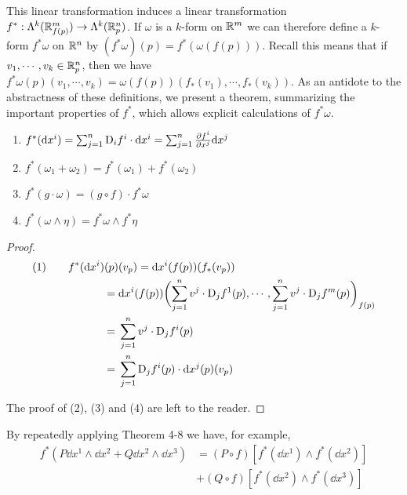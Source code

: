 This linear transformation induces a linear transformation $f^*:\Lambda^k(\mathbb{R}^m_{f(p)})\to \Lambda^k(\mathbb{R}^n_p)$.
If $\omega$ is a $k$-form on $\mathbb{R}^m$ we can therefore define a $k$-form $f^*\omega$ on $\mathbb{R}^n$ by
$(f^*\omega)(p) = f^*(\omega(f(p)))$. Recall this means that if $v_1,\cdots,v_k\in\mathbb{R}^n_p$, then we have 
$f^*\omega(p)(v_1,\cdots,v_k) = \omega(f(p))(f_*(v_1), \cdots, f_*(v_k))$. As an antidote to the abstractness
of these definitions, we present a theorem, summarizing the important properties of $f^*$, which allows explicit 
calculations of $f^*\omega$.

\begin{theorem}
    \begin{enumerate}[label=\upshape{(\arabic*)}]
        \item $f^*(\mathrm{d} x^i) = \sum_{j=1}^{n}{\mathrm{D}_if^i\cdot \mathrm{d} x^i} = \sum_{j=1}^{n}{\frac{\partial f^i}{\partial x^j}\mathrm{d} x^j}$
        \item $f^*(\omega_1+\omega_2) = f^*(\omega_1) + f^*(\omega_2)$
        \item $f^*(g\cdot \omega) = (g\circ f)\cdot f^*\omega$
        \item $f^*(\omega\wedge\eta) = f^*\omega\wedge f^*\eta$
    \end{enumerate}
\end{theorem}

\begin{proof}
  \begin{align*}
      \text{(1)}\qquad f^*(\mathrm{d} x^i)(p)&(v_p)
        = \mathrm{d} x^i(f(p))(f_*(v_p)) \\
      =\; & \mathrm{d} x^i(f(p))\biggl(\sum_{j=1}^{n}{v^j\cdot \mathrm{D}_jf^1(p)}, \cdots, \sum_{j=1}^{n}{v^j\cdot \mathrm{D}_jf^m(p)}\biggr)_{f(p)} \\
      =\; & \sum_{j=1}^{n}{v^j\cdot \mathrm{D}_jf^i(p)}\\
      =\; & \sum_{j=1}^{n}{\mathrm{D}_jf^i(p)\cdot \mathrm{d} x^j(p)(v_p)}
  \end{align*}

  The proof of (2), (3) and (4) are left to the reader.
\end{proof}

By repeatedly applying Theorem 4-8 we have, for example,
\begin{align*}
    f^*(P\dd x^1 \wedge \dd x^2 + Q\dd x^2 \wedge \dd x^3)
    & = (P\circ f)\left[f^*(\dd x^1)\wedge f^*(\dd x^2)\right]\\
    & + (Q\circ f)\left[f^*(\dd x^2)\wedge f^*(\dd x^3)\right]
\end{align*}

